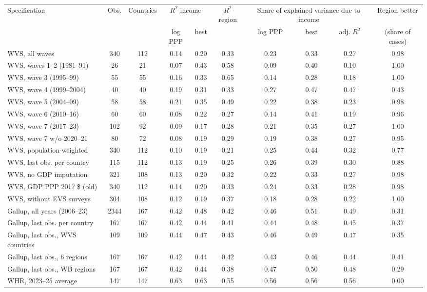 \begin{tabular}{lccccccccc}
\toprule
Specification & Obs. & Countries & \multicolumn{2}{c}{$R^2$ income} & $R^2$ region & \multicolumn{3}{c}{Share of explained variance due to income} & Region better \\ & & & log PPP & best & & log PPP & best & adj. $R^2$ & (share of cases) \\
\midrule
WVS, all waves & 340 & 112 & 0.14 & 0.20 & 0.33 & 0.23 & 0.33 & 0.27 & 0.98 \\
WVS, waves 1--2 (1981--91) & 26 & 21 & 0.07 & 0.43 & 0.58 & 0.09 & 0.40 & 0.10 & 1.00 \\
WVS, wave 3 (1995--99) & 55 & 55 & 0.16 & 0.33 & 0.65 & 0.14 & 0.28 & 0.18 & 1.00 \\
WVS, wave 4 (1999--2004) & 40 & 40 & 0.19 & 0.31 & 0.33 & 0.27 & 0.47 & 0.47 & 0.43 \\
WVS, wave 5 (2004--09) & 58 & 58 & 0.21 & 0.35 & 0.49 & 0.22 & 0.38 & 0.23 & 0.98 \\
WVS, wave 6 (2010--16) & 60 & 60 & 0.08 & 0.22 & 0.27 & 0.14 & 0.41 & 0.19 & 0.96 \\
WVS, wave 7 (2017--23) & 102 & 92 & 0.09 & 0.17 & 0.28 & 0.21 & 0.35 & 0.27 & 1.00 \\
WVS, wave 7 w/o 2020--21 & 80 & 72 & 0.08 & 0.19 & 0.29 & 0.19 & 0.38 & 0.27 & 0.95 \\
WVS, population-weighted & 340 & 112 & 0.10 & 0.19 & 0.21 & 0.25 & 0.44 & 0.32 & 0.77 \\
WVS, last obs. per country & 115 & 112 & 0.13 & 0.19 & 0.25 & 0.26 & 0.39 & 0.30 & 0.88 \\
WVS, no GDP imputation & 321 & 108 & 0.13 & 0.20 & 0.32 & 0.22 & 0.33 & 0.27 & 0.98 \\
WVS, GDP PPP 2017 \$ (old) & 340 & 112 & 0.14 & 0.20 & 0.33 & 0.24 & 0.33 & 0.28 & 0.98 \\
WVS, without EVS surveys & 304 & 108 & 0.12 & 0.19 & 0.37 & 0.18 & 0.28 & 0.22 & 1.00 \\
\midrule
Gallup, all years (2006--23) & 2344 & 167 & 0.42 & 0.48 & 0.42 & 0.46 & 0.51 & 0.49 & 0.31 \\
Gallup, last obs. per country & 167 & 167 & 0.42 & 0.44 & 0.41 & 0.44 & 0.48 & 0.45 & 0.37 \\
Gallup, last obs., WVS countries & 109 & 109 & 0.44 & 0.47 & 0.43 & 0.46 & 0.49 & 0.47 & 0.35 \\
Gallup, last obs., 6 regions & 167 & 167 & 0.42 & 0.44 & 0.42 & 0.43 & 0.46 & 0.44 & 0.41 \\
Gallup, last obs., WB regions & 167 & 167 & 0.42 & 0.44 & 0.38 & 0.47 & 0.50 & 0.48 & 0.29 \\
WHR, 2023--25 average & 147 & 147 & 0.63 & 0.63 & 0.55 & 0.56 & 0.56 & 0.56 & 0.00 \\
\bottomrule
\end{tabular}
